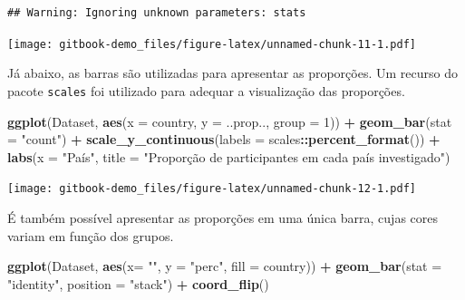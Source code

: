\documentclass[
]{book}
\newenvironment{Shaded}{\begin{snugshade}}{\end{snugshade}}
\newcommand{\DataTypeTok}[1]{\textcolor[rgb]{0.13,0.29,0.53}{#1}}
\newcommand{\DecValTok}[1]{\textcolor[rgb]{0.00,0.00,0.81}{#1}}
\newcommand{\KeywordTok}[1]{\textcolor[rgb]{0.13,0.29,0.53}{\textbf{#1}}}
\newcommand{\NormalTok}[1]{#1}
\newcommand{\OperatorTok}[1]{\textcolor[rgb]{0.81,0.36,0.00}{\textbf{#1}}}
\newcommand{\StringTok}[1]{\textcolor[rgb]{0.31,0.60,0.02}{#1}}
\begin{document}
\begin{verbatim}
## Warning: Ignoring unknown parameters: stats
\end{verbatim}

\texttt{[image: gitbook-demo\_files/figure-latex/unnamed-chunk-11-1.pdf]}

Já abaixo, as barras são utilizadas para apresentar as proporções. Um recurso do pacote \texttt{scales} foi utilizado para adequar a visualização das proporções.

\begin{Shaded}
\begin{Highlighting}[]
\KeywordTok{ggplot}\NormalTok{(Dataset, }\KeywordTok{aes}\NormalTok{(}\DataTypeTok{x =}\NormalTok{ country, }\DataTypeTok{y =}\NormalTok{ ..prop.., }\DataTypeTok{group =} \DecValTok{1}\NormalTok{)) }\OperatorTok{+}\StringTok{ }
\StringTok{  }\KeywordTok{geom_bar}\NormalTok{(}\DataTypeTok{stat =} \StringTok{"count"}\NormalTok{) }\OperatorTok{+}
\StringTok{  }\KeywordTok{scale_y_continuous}\NormalTok{(}\DataTypeTok{labels =}\NormalTok{ scales}\OperatorTok{::}\KeywordTok{percent_format}\NormalTok{()) }\OperatorTok{+}
\StringTok{  }\KeywordTok{labs}\NormalTok{(}\DataTypeTok{x =} \StringTok{"País"}\NormalTok{, }\DataTypeTok{title =} \StringTok{"Proporção de participantes em cada país investigado"}\NormalTok{)}
\end{Highlighting}
\end{Shaded}

\texttt{[image: gitbook-demo\_files/figure-latex/unnamed-chunk-12-1.pdf]}

É também possível apresentar as proporções em uma única barra, cujas cores variam em função dos grupos.

\begin{Shaded}
\begin{Highlighting}[]
\KeywordTok{ggplot}\NormalTok{(Dataset, }\KeywordTok{aes}\NormalTok{(}\DataTypeTok{x=} \StringTok{""}\NormalTok{, }\DataTypeTok{y =} \StringTok{"perc"}\NormalTok{, }\DataTypeTok{fill =}\NormalTok{ country)) }\OperatorTok{+}
\StringTok{  }\KeywordTok{geom_bar}\NormalTok{(}\DataTypeTok{stat =} \StringTok{"identity"}\NormalTok{, }\DataTypeTok{position =} \StringTok{"stack"}\NormalTok{) }\OperatorTok{+}
\StringTok{  }\KeywordTok{coord_flip}\NormalTok{()}
\end{Highlighting}
\end{Shaded}
\end{document}

